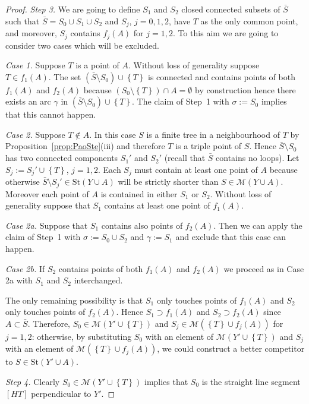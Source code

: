 \documentclass{amsart}
\newcommand{\ENCLOSE}[1]{\left\{#1\right\}}
\newcommand{\St}{\mathrm{St}}
\newcommand{\M}{\mathcal{M}}
\theoremstyle{definition}
\theoremstyle{remark}
\begin{document}
\begin{proof}
  \emph{Step 3.} 
  We are going to define $S_1$ and $S_2$ closed connected 
  subsets of $\bar S$ such that 
  $\bar S = S_0\cup S_1 \cup S_2$ 
  and $S_j$, $j=0,1,2$, have $T$ 
  as the only common point, and moreover,
  $S_j$ contains $f_j(A)$ for $j=1,2$.
  To this aim we are going to consider two cases 
  which will be excluded.

  \emph{Case 1.} 
  Suppose $T$ is a point of $A$.
  Without loss of generality suppose $T\in f_1(A)$.
  The set $(\bar S\setminus S_0)\cup\ENCLOSE{T}$
  is connected and contains points of both $f_1(A)$
  and $f_2(A)$ 
  because $(S_0\setminus\ENCLOSE{T})\cap A = \emptyset$ 
  by construction hence there exists an arc $\gamma$ 
  in $(\bar S\setminus S_0)\cup\ENCLOSE{T}$.
  The claim of Step~1 with $\sigma:=S_0$ implies that this cannot happen.
  
  \emph{Case 2.} Suppose $T\not \in A$.
  In this case $S$ is a finite tree in a neighbourhood of $T$
  by Proposition~\ref{prop:PaoSte}(iii) 
  and therefore $T$ is a triple point of $S$. 
  Hence $\bar S\setminus S_0$ has two connected components 
  $S_1'$ and $S_2'$ (recall that $\bar S$ contains no loops).
  Let $S_j:=S_j'\cup \ENCLOSE{T}$, $j=1,2$.
  Each $S_j$ must contain at least one point of $A$ because otherwise 
  $\bar S\setminus S_j'\in \St(Y\cup A)$ will be 
  strictly shorter than $S\in \M(Y\cup A)$.
  Moreover each point of $A$ is contained in either $S_1$ or $S_2$.
  Without loss of generality suppose that $S_1$ 
  contains at least one point of $f_1(A)$.
  
  \emph{Case 2a.} 
  Suppose that $S_1$ contains also points of $f_2(A)$.
  Then we can apply the claim of Step~1 with 
  $\sigma:= S_0 \cup S_2$ and 
  $\gamma:= S_1$ and exclude that this case can happen.
  
  \emph{Case 2b.} If $S_2$ contains points of both 
  $f_1(A)$ and $f_2(A)$ we proceed 
  as in Case 2a with $S_1$ and $S_2$ interchanged.
  
  The only remaining possibility is that $S_1$ 
  only touches points of $f_1(A)$ 
  and $S_2$ only touches points of $f_2(A)$. 
  Hence $S_1\supset f_1(A)$ and $S_2\supset f_2(A)$ since $A\subset \bar S$.
  Therefore, $S_0\in \M(Y'\cup \ENCLOSE{T})$  
  and $S_j \in \M(\ENCLOSE{T} \cup f_j(A))$ for $j=1,2$:
  otherwise, by substituting $S_0$ with an element of $\M(Y'\cup \ENCLOSE{T})$
  and $S_j$ with an element of $\M(\ENCLOSE{T}\cup f_j(A))$,
  we could construct a better competitor 
  to $S\in \St(Y'\cup A)$.
  
  \emph{Step 4.} 
  Clearly $S_0\in \M(Y'\cup \ENCLOSE{T})$ implies that $S_0$ is the straight 
  line segment $[HT]$ perpendicular to $Y'$.
  

\end{proof}
\end{document}
